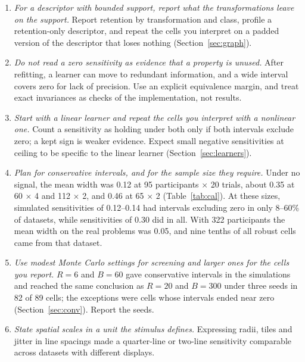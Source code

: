 \documentclass[man,floatsintext,12pt]{apa7}
\begin{document}
\begin{enumerate}
\item \emph{For a descriptor with bounded support, report what the transformations leave on the support.} Report retention by transformation and class, profile a retention-only descriptor, and repeat the cells you interpret on a padded version of the descriptor that loses nothing (Section~\ref{sec:graph}).
\item \emph{Do not read a zero sensitivity as evidence that a property is unused.} After refitting, a learner can move to redundant information, and a wide interval covers zero for lack of precision. Use an explicit equivalence margin, and treat exact invariances as checks of the implementation, not results.
\item \emph{Start with a linear learner and repeat the cells you interpret with a nonlinear one.} Count a sensitivity as holding under both only if both intervals exclude zero; a kept sign is weaker evidence. Expect small negative sensitivities at ceiling to be specific to the linear learner (Section~\ref{sec:learners}).
\item \emph{Plan for conservative intervals, and for the sample size they require.} Under no signal, the mean width was 0.12 at 95 participants $\times$ 20 trials, about 0.35 at 60 $\times$ 4 and 112 $\times$ 2, and 0.46 at 65 $\times$ 2 (Table~\ref{tab:cal}). At these sizes, simulated sensitivities of 0.12--0.14 had intervals excluding zero in only 8--60\% of datasets, while sensitivities of 0.30 did in all. With 322 participants the mean width on the real problems was 0.05, and nine tenths of all robust cells came from that dataset.
\item \emph{Use modest Monte Carlo settings for screening and larger ones for the cells you report.} $R = 6$ and $B = 60$ gave conservative intervals in the simulations and reached the same conclusion as $R = 20$ and $B = 300$ under three seeds in 82 of 89 cells; the exceptions were cells whose intervals ended near zero (Section~\ref{sec:conv}). Report the seeds.
\item \emph{State spatial scales in a unit the stimulus defines.} Expressing radii, tiles and jitter in line spacings made a quarter-line or two-line sensitivity comparable across datasets with different displays.
\end{enumerate}
\end{document}
